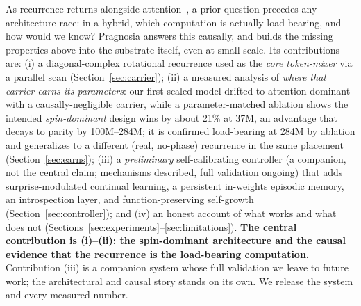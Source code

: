 \documentclass[10pt,twocolumn]{article}
\begin{document}
As recurrence returns alongside attention~\cite{tiezzi2025recurrent}, a prior question precedes any architecture race: in a hybrid, which computation is actually load-bearing, and how would we know? Pragnosia answers this causally, and builds the missing properties above into the substrate itself, even at small scale. Its contributions are: (i) a diagonal-complex rotational recurrence used as the \emph{core token-mixer} via a parallel scan (Section~\ref{sec:carrier}); (ii) a measured analysis of \emph{where that carrier earns its parameters}: our first scaled model drifted to attention-dominant with a causally-negligible carrier, while a parameter-matched ablation shows the intended \emph{spin-dominant} design wins by about 21\% at 37M, an advantage that decays to parity by 100M--284M; it is confirmed load-bearing at 284M by ablation and generalizes to a different (real, no-phase) recurrence in the same placement (Section~\ref{sec:earns}); (iii) a \emph{preliminary} self-calibrating controller (a companion, not the central claim; mechanisms described, full validation ongoing) that adds surprise-modulated continual learning, a persistent in-weights episodic memory, an introspection layer, and function-preserving self-growth (Section~\ref{sec:controller}); and (iv) an honest account of what works and what does not (Sections~\ref{sec:experiments}--\ref{sec:limitations}). \textbf{The central contribution is (i)--(ii): the spin-dominant architecture and the causal evidence that the recurrence is the load-bearing computation.} Contribution (iii) is a companion system whose full validation we leave to future work; the architectural and causal story stands on its own. We release the system and every measured number.
\end{document}
